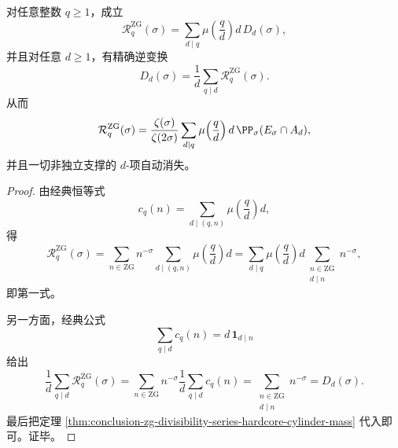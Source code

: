 \begin{theorem}\label{thm:conclusion-zg-ramanujan-shadow-divisor-cylinder-inversion}
对任意整数 \(q\ge 1\)，成立
\[
\mathcal R_q^{\mathrm{ZG}}(\sigma)
=
\sum_{d\mid q}\mu\!\left(\frac{q}{d}\right)d\,D_d(\sigma),
\]
并且对任意 \(d\ge 1\)，有精确逆变换
\[
D_d(\sigma)
=
\frac1d\sum_{q\mid d}\mathcal R_q^{\mathrm{ZG}}(\sigma).
\]
从而
\[
\mathcal R_q^{\mathrm{ZG}}(\sigma)
=
\frac{\zeta(\sigma)}{\zeta(2\sigma)}
\sum_{d\mid q}\mu\!\left(\frac{q}{d}\right)d\,\PP_\sigma(E_\sigma\cap A_d),
\]
并且一切非独立支撑的 \(d\)-项自动消失。
\end{theorem}
\begin{proof}
由经典恒等式
\[
c_q(n)=\sum_{d\mid(q,n)}\mu\!\left(\frac{q}{d}\right)d,
\]
得
\[
\mathcal R_q^{\mathrm{ZG}}(\sigma)
=
\sum_{n\in \mathrm{ZG}}n^{-\sigma}\sum_{d\mid(q,n)}\mu\!\left(\frac{q}{d}\right)d
=
\sum_{d\mid q}\mu\!\left(\frac{q}{d}\right)d
\sum_{\substack{n\in \mathrm{ZG}\\ d\mid n}}n^{-\sigma},
\]
即第一式。

另一方面，经典公式
\[
\sum_{q\mid d}c_q(n)=d\,\mathbf 1_{d\mid n}
\]
给出
\[
\frac1d\sum_{q\mid d}\mathcal R_q^{\mathrm{ZG}}(\sigma)
=
\sum_{n\in \mathrm{ZG}}n^{-\sigma}\frac1d\sum_{q\mid d}c_q(n)
=
\sum_{\substack{n\in \mathrm{ZG}\\ d\mid n}}n^{-\sigma}
=
D_d(\sigma).
\]
最后把定理 \ref{thm:conclusion-zg-divisibility-series-hardcore-cylinder-mass} 代入即可。证毕。
\end{proof}

